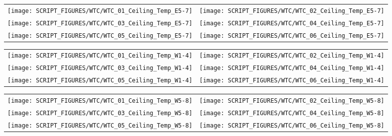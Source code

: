 \begin{figure}[p]
\begin{tabular*}{\textwidth}{l@{\extracolsep{\fill}}r}
\texttt{[image: SCRIPT\_FIGURES/WTC/WTC\_01\_Ceiling\_Temp\_E5-7]} &
\texttt{[image: SCRIPT\_FIGURES/WTC/WTC\_02\_Ceiling\_Temp\_E5-7]} \\
\texttt{[image: SCRIPT\_FIGURES/WTC/WTC\_03\_Ceiling\_Temp\_E5-7]} &
\texttt{[image: SCRIPT\_FIGURES/WTC/WTC\_04\_Ceiling\_Temp\_E5-7]} \\
\texttt{[image: SCRIPT\_FIGURES/WTC/WTC\_05\_Ceiling\_Temp\_E5-7]} &
\texttt{[image: SCRIPT\_FIGURES/WTC/WTC\_06\_Ceiling\_Temp\_E5-7]}
\end{tabular*}
\label{NIST_WTC_Ceiling_E5-7}
\end{figure}

\begin{figure}[p]
\begin{tabular*}{\textwidth}{l@{\extracolsep{\fill}}r}
\texttt{[image: SCRIPT\_FIGURES/WTC/WTC\_01\_Ceiling\_Temp\_W1-4]} &
\texttt{[image: SCRIPT\_FIGURES/WTC/WTC\_02\_Ceiling\_Temp\_W1-4]} \\
\texttt{[image: SCRIPT\_FIGURES/WTC/WTC\_03\_Ceiling\_Temp\_W1-4]} &
\texttt{[image: SCRIPT\_FIGURES/WTC/WTC\_04\_Ceiling\_Temp\_W1-4]} \\
\texttt{[image: SCRIPT\_FIGURES/WTC/WTC\_05\_Ceiling\_Temp\_W1-4]} &
\texttt{[image: SCRIPT\_FIGURES/WTC/WTC\_06\_Ceiling\_Temp\_W1-4]}
\end{tabular*}
\label{NIST_WTC_Ceiling_W1-4}
\end{figure}

\begin{figure}[p]
\begin{tabular*}{\textwidth}{l@{\extracolsep{\fill}}r}
\texttt{[image: SCRIPT\_FIGURES/WTC/WTC\_01\_Ceiling\_Temp\_W5-8]} &
\texttt{[image: SCRIPT\_FIGURES/WTC/WTC\_02\_Ceiling\_Temp\_W5-8]} \\
\texttt{[image: SCRIPT\_FIGURES/WTC/WTC\_03\_Ceiling\_Temp\_W5-8]} &
\texttt{[image: SCRIPT\_FIGURES/WTC/WTC\_04\_Ceiling\_Temp\_W5-8]} \\
\texttt{[image: SCRIPT\_FIGURES/WTC/WTC\_05\_Ceiling\_Temp\_W5-8]} &
\texttt{[image: SCRIPT\_FIGURES/WTC/WTC\_06\_Ceiling\_Temp\_W5-8]}
\end{tabular*}
\label{NIST_WTC_Ceiling_W5-8}
\end{figure}

